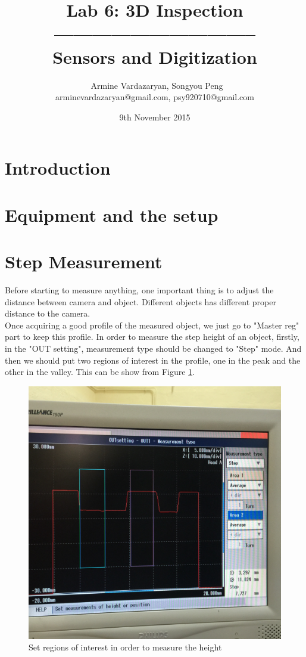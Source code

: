 \documentclass[english]{article}
\begin{document}
\title{Lab 6: 3D Inspection\\ -------------------------------- \\ \Large Sensors and Digitization}
\author{ \ Armine Vardazaryan, Songyou Peng \\ arminevardazaryan@gmail.com, psy920710@gmail.com}
\date{9th November 2015}

\maketitle

\section*{Introduction}

\section*{Equipment and the setup}

\section*{Step Measurement}

Before starting to measure anything, one important thing is to adjust the distance between camera and object. Different objects has different proper distance to the camera. \\

Once acquiring a good profile of the measured object, we just go to "Master reg" part to keep this profile. In order to measure the step height of an object, firstly, in the "OUT setting", measurement type should be changed to "Step" mode. And then we should put two regions of interest in the profile, one in the peak and the other in the valley. This can be show from Figure \ref{fig:one}.\\

\begin{figure}[H]
	\centering
	\includegraphics[width=0.8\linewidth]{Lab6/Step1.JPG}
	\caption{Set regions of interest in order to measure the height}
	\label{fig:one}
\end{figure}
\end{document}

